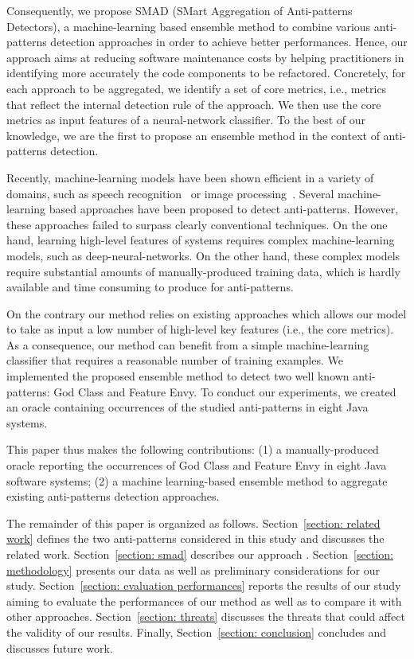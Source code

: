 Consequently, we propose SMAD (SMart Aggregation of Anti-patterns Detectors), a machine-learning based ensemble method to combine various anti-patterns detection approaches in order to achieve better performances. Hence, our approach aims at reducing software maintenance costs by helping practitioners in identifying more accurately the code components to be refactored. Concretely, for each approach to be aggregated, we identify a set of core metrics, i.e., metrics that reflect the internal detection rule of the approach. We then use the core metrics as input features of a neural-network classifier. To the best of our knowledge, we are the first to propose an ensemble method in the context of anti-patterns detection.

Recently, machine-learning models have been shown efficient in a variety of domains, such as speech recognition~\cite{graves2013speech} or image processing~\cite{krizhevsky2012imagenet}. Several machine-learning based approaches have been proposed to detect anti-patterns. However, these approaches failed to surpass clearly conventional techniques. On the one hand, learning high-level features of systems requires complex machine-learning models, such as deep-neural-networks. On the other hand, these complex models require substantial amounts of manually-produced training data, which is hardly available and time consuming to produce for anti-patterns.

On the contrary our method relies on existing approaches which allows our model to take as input a low number of high-level key features (i.e.,  the core metrics). As a consequence, our method can benefit from a simple machine-learning classifier that requires a reasonable number of training examples. We implemented the proposed ensemble method to detect two well known anti-patterns: God Class and Feature Envy. To conduct our experiments, we created an oracle containing occurrences of the studied anti-patterns in eight Java systems. 

This paper thus makes the following contributions: (1) a manually-produced oracle reporting the occurrences of God Class and Feature Envy in eight Java software systems; (2) a machine learning-based ensemble method to aggregate existing anti-patterns detection approaches.

The remainder of this paper is organized as follows. Section~\ref{section: related work} defines the two anti-patterns considered in this study and discusses the related work. Section~\ref{section: smad} describes our approach \NAME{}. Section~\ref{section: methodology} presents our data as well as preliminary considerations for our study. Section~\ref{section: evaluation performances} reports the results of our study aiming to evaluate the performances of our method as well as to compare it with other approaches. Section~\ref{section: threats} discusses the threats that could affect the validity of our results. Finally, Section~\ref{section: conclusion} concludes and discusses future work.